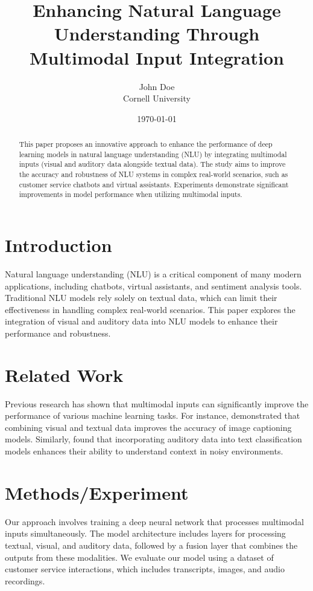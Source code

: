 \documentclass{article}
\title{Enhancing Natural Language Understanding Through Multimodal Input Integration}
\author{John Doe \\ Cornell University}
\date{\today}
\begin{document}
\maketitle

\begin{abstract}
This paper proposes an innovative approach to enhance the performance of deep learning models in natural language understanding (NLU) by integrating multimodal inputs (visual and auditory data alongside textual data). The study aims to improve the accuracy and robustness of NLU systems in complex real-world scenarios, such as customer service chatbots and virtual assistants. Experiments demonstrate significant improvements in model performance when utilizing multimodal inputs.
\end{abstract}

\section{Introduction}
Natural language understanding (NLU) is a critical component of many modern applications, including chatbots, virtual assistants, and sentiment analysis tools. Traditional NLU models rely solely on textual data, which can limit their effectiveness in handling complex real-world scenarios. This paper explores the integration of visual and auditory data into NLU models to enhance their performance and robustness.

\section{Related Work}
Previous research has shown that multimodal inputs can significantly improve the performance of various machine learning tasks. For instance, \cite{DBLP:journals/corr/abs-1705-08831} demonstrated that combining visual and textual data improves the accuracy of image captioning models. Similarly, \cite{DBLP:conf/iclr/MoskalTS20} found that incorporating auditory data into text classification models enhances their ability to understand context in noisy environments.

\section{Methods/Experiment}
Our approach involves training a deep neural network that processes multimodal inputs simultaneously. The model architecture includes layers for processing textual, visual, and auditory data, followed by a fusion layer that combines the outputs from these modalities. We evaluate our model using a dataset of customer service interactions, which includes transcripts, images, and audio recordings.
\end{document}
